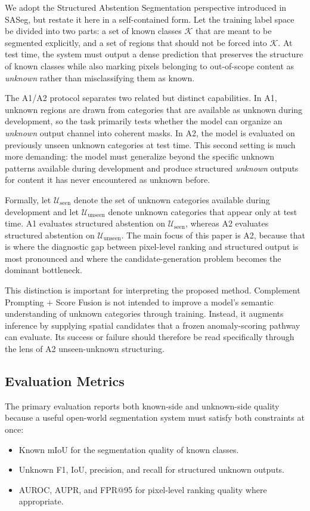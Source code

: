 \documentclass[a4paper,fleqn]{cas-dc}
\newcommand{\method}{Complement Prompting + Score Fusion}
\newcommand{\unknown}{\textit{unknown}}
\begin{document}
We adopt the Structured Abstention Segmentation perspective introduced in SASeg, but restate it here in a self-contained form. Let the training label space be divided into two parts: a set of known classes $\mathcal{K}$ that are meant to be segmented explicitly, and a set of regions that should not be forced into $\mathcal{K}$. At test time, the system must output a dense prediction that preserves the structure of known classes while also marking pixels belonging to out-of-scope content as \unknown{} rather than misclassifying them as known.

The A1/A2 protocol separates two related but distinct capabilities. In A1, unknown regions are drawn from categories that are available as unknown during development, so the task primarily tests whether the model can organize an \unknown{} output channel into coherent masks. In A2, the model is evaluated on previously unseen unknown categories at test time. This second setting is much more demanding: the model must generalize beyond the specific unknown patterns available during development and produce structured \unknown{} outputs for content it has never encountered as unknown before.

Formally, let $\mathcal{U}_{\text{seen}}$ denote the set of unknown categories available during development and let $\mathcal{U}_{\text{unseen}}$ denote unknown categories that appear only at test time. A1 evaluates structured abstention on $\mathcal{U}_{\text{seen}}$, whereas A2 evaluates structured abstention on $\mathcal{U}_{\text{unseen}}$. The main focus of this paper is A2, because that is where the diagnostic gap between pixel-level ranking and structured output is most pronounced and where the candidate-generation problem becomes the dominant bottleneck.

This distinction is important for interpreting the proposed method. \method{} is not intended to improve a model's semantic understanding of unknown categories through training. Instead, it augments inference by supplying spatial candidates that a frozen anomaly-scoring pathway can evaluate. Its success or failure should therefore be read specifically through the lens of A2 unseen-unknown structuring.

\subsection{Evaluation Metrics}
\label{sec:problem:metrics}

The primary evaluation reports both known-side and unknown-side quality because a useful open-world segmentation system must satisfy both constraints at once:
\begin{itemize}
  \item Known mIoU for the segmentation quality of known classes.
  \item Unknown F1, IoU, precision, and recall for structured unknown outputs.
  \item AUROC, AUPR, and FPR@95 for pixel-level ranking quality where appropriate.
\end{itemize}
\end{document}
